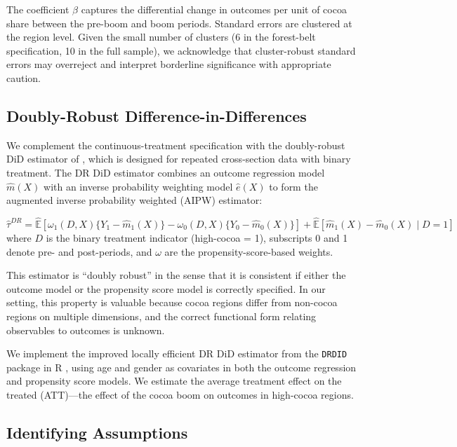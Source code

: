 \documentclass[12pt]{article}
\newcommand{\E}{\mathbb{E}}
\begin{document}
The coefficient $\beta$ captures the differential change in outcomes per unit of cocoa share between the pre-boom and boom periods. Standard errors are clustered at the region level. Given the small number of clusters (6 in the forest-belt specification, 10 in the full sample), we acknowledge that cluster-robust standard errors may overreject \citep{cameron2008} and interpret borderline significance with appropriate caution.

\subsection{Doubly-Robust Difference-in-Differences}

We complement the continuous-treatment specification with the doubly-robust DiD estimator of \citet{santanna2020}, which is designed for repeated cross-section data with binary treatment. The DR DiD estimator combines an outcome regression model $\hat{m}(X)$ with an inverse probability weighting model $\hat{e}(X)$ to form the augmented inverse probability weighted (AIPW) estimator:

\begin{equation}
\hat{\tau}^{DR} = \hat{\E}\left[\omega_1(D, X)\{Y_1 - \hat{m}_1(X)\} - \omega_0(D, X)\{Y_0 - \hat{m}_0(X)\}\right] + \hat{\E}\left[\hat{m}_1(X) - \hat{m}_0(X) \mid D = 1\right]
\label{eq:drdid}
\end{equation}
where $D$ is the binary treatment indicator (high-cocoa = 1), subscripts 0 and 1 denote pre- and post-periods, and $\omega$ are the propensity-score-based weights.

This estimator is ``doubly robust'' in the sense that it is consistent if either the outcome model or the propensity score model is correctly specified. In our setting, this property is valuable because cocoa regions differ from non-cocoa regions on multiple dimensions, and the correct functional form relating observables to outcomes is unknown.

We implement the improved locally efficient DR DiD estimator from the \texttt{DRDID} package in R \citep{santanna2020}, using age and gender as covariates in both the outcome regression and propensity score models. We estimate the average treatment effect on the treated (ATT)---the effect of the cocoa boom on outcomes in high-cocoa regions.

\subsection{Identifying Assumptions}
\end{document}

